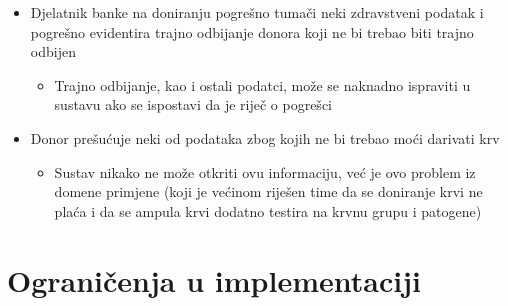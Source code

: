 \begin{itemize}
                \item Djelatnik banke na doniranju pogrešno tumači neki zdravstveni podatak i pogrešno evidentira trajno odbijanje donora koji ne bi trebao biti trajno odbijen
                \begin{itemize}
                    \item Trajno odbijanje, kao i ostali podatci, može se naknadno ispraviti u sustavu ako se ispostavi da je riječ o pogrešci
                \end{itemize}
                
                \item Donor prešućuje neki od podataka zbog kojih ne bi trebao moći darivati krv
                \begin{itemize}
                    \item Sustav nikako ne može otkriti ovu informaciju, već je ovo problem iz domene primjene (koji je većinom riješen time da se doniranje krvi ne plaća i da se ampula krvi dodatno testira na krvnu grupu i patogene)
                \end{itemize}
                
            \end{itemize}
        
        
        \section{Ograničenja u implementaciji}
            
